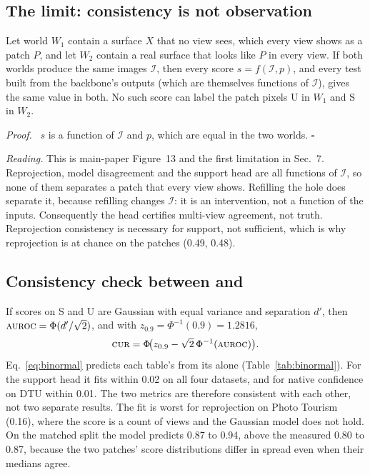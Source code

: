 \subsection{The limit: consistency is not observation}

\begin{proposition}[Indistinguishability]\label{prop:limit}
Let world $W_1$ contain a surface $X$ that no view sees, which every view shows
as a patch $P$, and let $W_2$ contain a real surface that looks like $P$ in
every view. If both worlds produce the same images $\mathcal{I}$, then every
score $s=f(\mathcal{I},p)$, and every test built from the backbone's outputs
(which are themselves functions of $\mathcal{I}$), gives the same value in both.
No such score can label the patch pixels U in $W_1$ and S in $W_2$.
\end{proposition}
\par\noindent\emph{Proof.}~
$s$ is a function of $\mathcal{I}$ and $p$, which are equal in the two worlds.
\hfill$\square$\par

\noindent\emph{Reading.} This is main-paper Figure~13 and the first limitation
in Sec.~7. Reprojection, model disagreement and the support head are all
functions of $\mathcal{I}$, so none of them separates a patch that every view
shows. Refilling the hole does separate it, because refilling changes
$\mathcal{I}$: it is an intervention, not a function of the inputs.
Consequently the head certifies multi-view agreement, not truth. Reprojection
consistency is necessary for support, not sufficient, which is why
reprojection is at chance on the patches (0.49, 0.48).

\subsection{Consistency check between \auroc{} and \cur}

If scores on S and U are Gaussian with equal variance and separation $d'$,
then $\textsc{auroc}=\Phi(d'/\sqrt2)$, and with $z_{0.9}=\Phi^{-1}(0.9)=1.2816$,
\begin{equation}
  \textsc{cur}=\Phi\!\big(z_{0.9}-\sqrt2\,\Phi^{-1}(\textsc{auroc})\big).
  \label{eq:binormal}
\end{equation}
Eq.~\eqref{eq:binormal} predicts each table's \cur{} from its \auroc{} alone
(Table~\ref{tab:binormal}). For the support head it fits within 0.02 on all
four datasets, and for native confidence on DTU within 0.01. The two metrics
are therefore consistent with each other, not two separate results. The fit is
worst for reprojection on Photo Tourism (0.16), where the score is a count of
views and the Gaussian model does not hold. On the matched split the model
predicts 0.87 to 0.94, above the measured 0.80 to 0.87, because the two
patches' score distributions differ in spread even when their medians agree.

